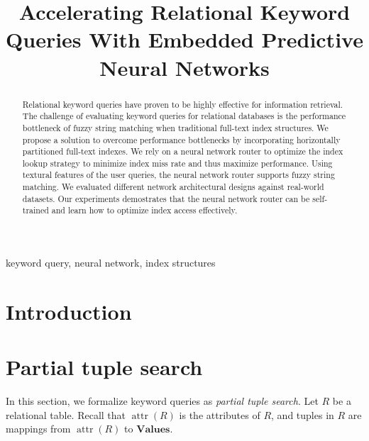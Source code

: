 \documentclass[conference]{IEEEtran}
\newcommand{\Attr}{\operatorname{attr}}
\newcommand{\Values}{\mathbf{Values}}
\begin{document}
\title{
Accelerating Relational Keyword Queries With Embedded Predictive Neural Networks
}

\author{
\and
{}
}

\maketitle

\begin{abstract}
Relational keyword queries have proven to be highly effective for
information retrieval.  The challenge of evaluating keyword queries for
relational databases is the performance bottleneck of fuzzy string
matching when traditional full-text index structures.  We propose a
solution to overcome performance bottlenecks by incorporating
horizontally partitioned full-text indexes.  We rely on a neural
network router to optimize the index lookup strategy to minimize index
miss rate and thus maximize performance.  Using textural features of
the user queries, the neural network router supports fuzzy string
matching.  We evaluated different network architectural designs against
real-world datasets.  Our experiments demostrates that the neural
network router can be self-trained and learn how to optimize index
access effectively.
\end{abstract}

\begin{IEEEkeywords}
keyword query, neural network, index structures
\end{IEEEkeywords}

\section{Introduction}


\section{Partial tuple search}
In this section, we formalize keyword queries as {\em partial tuple search}.
Let $R$ be a relational table.  Recall that $\Attr(R)$ is the attributes of $R$, and tuples in $R$ are mappings from $\Attr(R)$ to $\Values$.
\end{document}
